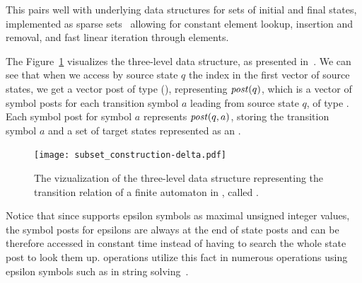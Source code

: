 This pairs well with underlying data structures for sets of initial and final states, implemented as sparse sets~\cite{sparseset93} allowing for constant element lookup, insertion and removal, and fast linear iteration through elements.

The Figure~\ref{fig:delta_struct} visualizes the three-level \deltastruct data structure, as presented in~\cite{tacas24_mata_10.1007/978-3-031-57249-4_7}.
We can see that when we access by source state $q$ the index in the first vector of source states, we get a vector post of type \statepost (\statepost[q]), representing $\mathit{post}(q)$, which is a vector of symbol posts for each transition symbol $a$ leading from source state $q$, of type \symbolpost.
Each symbol post for symbol $a$ represents $\mathit{post}(q, a)$, storing the transition symbol $a$ and a set of target states represented as an \ordvector.

\begin{figure}[ht]
  \centering
  \texttt{[image: subset\_construction-delta.pdf]}
\caption{
The vizualization of the three-level data structure representing the transition relation of a finite automaton in \mata, called \deltastruct.
}
\label{fig:delta_struct}
\end{figure}

Notice that since \mata supports epsilon symbols as maximal unsigned integer values, the symbol posts for epsilons are always at the end of state posts and can be therefore accessed in constant time instead of having to search the whole state post to look them up. \mata operations utilize this fact in numerous operations using epsilon symbols such as in string solving~\cite{fm23_equations_synergy_regular_constraints_DBLP:conf/fm/BlahoudekCCHHLS23}.

